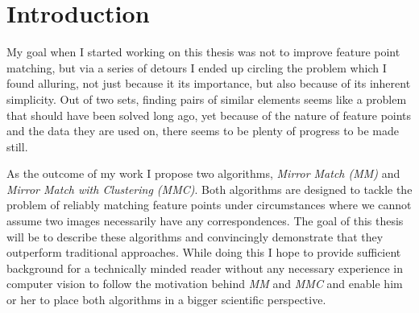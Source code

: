 \chapter*{Introduction}

My goal when I started working on this thesis was not to improve feature 
point matching, but via a series of detours I ended up circling the 
problem which I found alluring, not just because it its importance, but 
also because of its inherent simplicity. Out of two sets, finding pairs 
of similar elements seems like a problem that should have been solved 
long ago, yet because of the nature of feature points and the data they 
are used on, there seems to be plenty of progress to be made still.

As the outcome of my work I propose two algorithms, \emph{Mirror Match 
(MM)} and \emph{Mirror Match with Clustering (MMC)}. Both algorithms are 
designed to tackle the problem of reliably matching feature points under 
circumstances where we cannot assume two images necessarily have any 
correspondences.  The goal of this thesis will be to describe these 
algorithms and convincingly demonstrate that they outperform traditional 
approaches.  While doing this I hope to provide sufficient background 
for a technically minded reader without any necessary experience in 
computer vision to follow the motivation behind \emph{MM} and \emph{MMC} 
and enable him or her to place both algorithms in a bigger scientific 
perspective.
 
